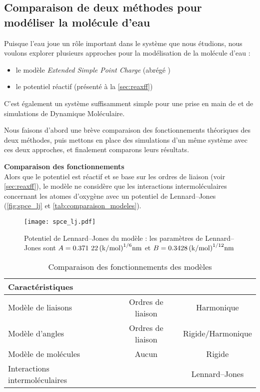     \subsection{Comparaison de deux méthodes pour modéliser la molécule d'eau} \label{sec:h2o}

Puisque l'eau joue un rôle important dans le système que nous étudions, nous voulons explorer plusieurs approches pour la modélisation de la molécule d'eau :
\begin{itemize}
    \item le modèle \emph{Extended Simple Point Charge} (abrégé \spce{})\cite{pullman_interaction_1981}\cite{berendsen_missing_1987}
    \item le potentiel réactif \reaxff{} (présenté à la \autoref{sec:reaxff})
\end{itemize}

C'est également un système suffisamment simple pour une prise en main de \lammps{} et de simulations de Dynamique Moléculaire.

Nous faisons d'abord une brève comparaison des fonctionnements théoriques des deux méthodes, puis mettons en place des simulations d'un même système avec ces deux approches, et finalement comparons leurs résultats.

\textbf{Comparaison des fonctionnements}\\
Alors que le potentiel \reaxff{} est réactif et se base sur les ordres de liaison (voir \autoref{sec:reaxff}), le modèle \spce{} ne considère que les interactions intermoléculaires concernant les atomes d'oxygène avec un potentiel de Lennard--Jones (\autoref{fig:spce_lj} et \autoref{tab:comparaison_modeles}).

\begin{figure}[h!]
    \centering
    \texttt{[image: spce\_lj.pdf]}
    \caption{Potentiel de Lennard--Jones du modèle \spce{} : {\footnotesize les paramètres de Lennard--Jones sont $A = \qty{0.37122}{(\kilo \cal \per \mol)\tothe{1/6} \nano \meter}$ et $B = \qty{0.3428}{(\kilo \cal \per \mol)\tothe{1/12} \nano \meter}$}}
    \label{fig:spce_lj}
\end{figure}

\begin{table}[h!]
    \centering
    \begin{tabular}{l || c | c}
        \hline
        Caractéristiques               & \reaxff{}         & \spce{}           \\
        \hline
        Modèle de liaisons             & Ordres de liaison & Harmonique \\
        Modèle d'angles                & Ordres de liaison & Rigide/Harmonique \\
        Modèle de molécules            & Aucun             & Rigide            \\
        Interactions intermoléculaires & \reaxff{}         & Lennard--Jones    \\
        \hline
    \end{tabular}
    \caption{Comparaison des fonctionnements des modèles}
    \label{tab:comparaison_modeles}
\end{table}

